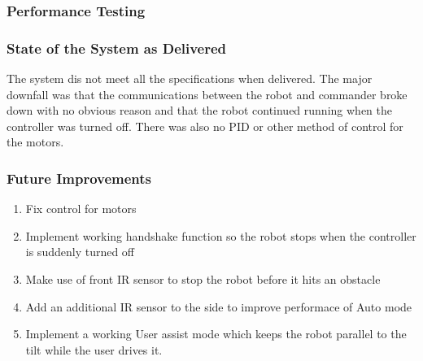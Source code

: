 \documentclass[MTRX3700report.tex]{subfiles}
\begin{document}
\setcounter{subsection}{1} %


\subsubsection{Performance Testing}

\subsubsection{State of the System as Delivered}
The system dis not meet all the specifications when delivered. The major downfall was that the communications between the robot and commander broke down with no obvious reason and that the robot continued running when the controller was turned off. There was also no PID or other method of control for the motors.
\subsubsection{Future Improvements}
\begin{enumerate}
	\item Fix control for motors
	\item Implement working handshake function so the robot stops when the controller is suddenly turned off
	\item Make use of front IR sensor to stop the robot before it hits an obstacle
	\item Add an additional IR sensor to the side to improve performace of Auto mode 
	\item Implement a working User assist mode which keeps the robot parallel to the tilt while the user drives it.
\end{enumerate}
\end{document}
